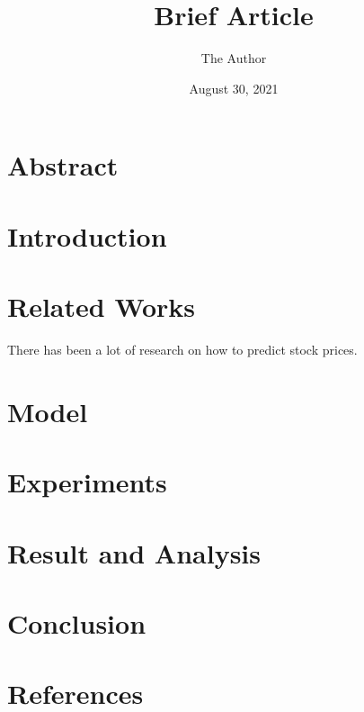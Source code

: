 \documentclass[11pt, oneside, twocolumn]{article}   	%
\title{Brief Article}
\author{The Author}
\date{August 30, 2021}							%
\begin{document}
\maketitle

\section{Abstract}
\section{Introduction}
\section{Related Works}
There has been a lot of research on how to predict stock prices.
\section{Model}
\section{Experiments}
\section{Result and Analysis}
\section{Conclusion}
\section{References}
\end{document}

